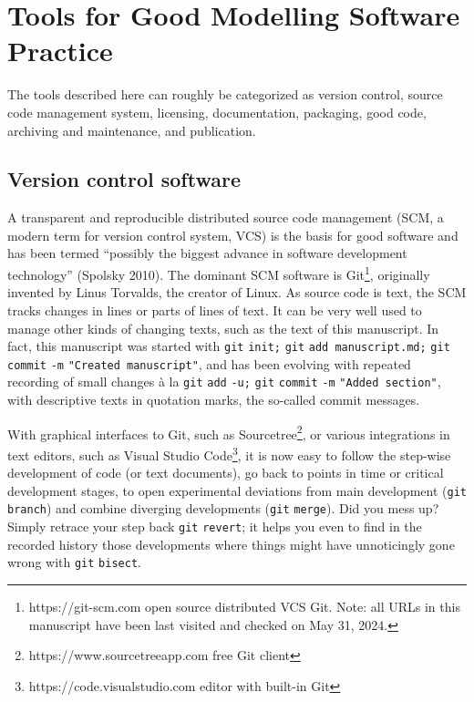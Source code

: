 \documentclass[preprint,11pt,5p]{elsarticle}
\begin{document}
\section{Tools for Good Modelling Software
Practice}\label{tools-for-good-modelling-software-practice}

The tools described here can roughly be categorized as version control,
source code management system, licensing, documentation, packaging, good
code, archiving and maintenance, and publication.

\subsection{Version control software}\label{version-control-software}

A transparent and reproducible distributed source code management (SCM,
a modern term for version control system, VCS) is the basis for good
software and has been termed ``possibly the biggest advance in software
development technology'' (Spolsky 2010). The dominant SCM software is
Git\footnote{https://git-scm.com open source distributed VCS Git. Note:
  all URLs in this manuscript have been last visited and checked on May
  31, 2024.}, originally invented by Linus Torvalds, the creator of
Linux. As source code is text, the SCM tracks changes in lines or parts
of lines of text. It can be very well used to manage other kinds of
changing texts, such as the text of this manuscript. In fact, this
manuscript was started with \texttt{git} \texttt{init;} \texttt{git}
\texttt{add\ manuscript.md;} \texttt{git} \texttt{commit} \texttt{-m}
\texttt{"Created\ manuscript"}, and has been evolving with repeated
recording of small changes à la \texttt{git} \texttt{add} \texttt{-u;}
\texttt{git} \texttt{commit} \texttt{-m} \texttt{"Added\ section"}, with
descriptive texts in quotation marks, the so-called commit messages.

With graphical interfaces to Git, such as Sourcetree\footnote{https://www.sourcetreeapp.com
  free Git client}, or various integrations in text editors, such as
Visual Studio Code\footnote{https://code.visualstudio.com editor with
  built-in Git}, it is now easy to follow the step-wise development of
code (or text documents), go back to points in time or critical
development stages, to open experimental deviations from main
development (\texttt{git} \texttt{branch}) and combine diverging
developments (\texttt{git} \texttt{merge}). Did you mess up? Simply
retrace your step back \texttt{git} \texttt{revert}; it helps you even
to find in the recorded history those developments where things might
have unnoticingly gone wrong with \texttt{git} \texttt{bisect}.
\end{document}
